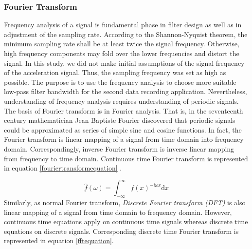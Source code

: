 \documentclass[english,12pt,a4paper,pdftex,elec,utf8]{aaltothesis}
\begin{document}
\subsubsection{Fourier Transform} \label{fouriertransformsection}

Frequency analysis of a signal is fundamental phase in filter design as well as in adjustment of the sampling rate. According to the Shannon-Nyquist theorem, the minimum sampling rate shall be at least twice the signal frequency. Otherwise, high frequency components may fold over the lower frequencies and distort the signal. In this study, we did not make initial assumptions of the signal frequency of the acceleration signal. Thus, the sampling frequency was set as high as possible. The purpose is to use the frequency analysis to choose more suitable low-pass filter bandwidth for the second data recording application. Nevertheless, understanding of frequency analysis requires understanding of periodic signals. The basis of Fourier transform is in Fourier analysis. That is, in the seventeenth century mathematician Jean Baptiste Fourier discovered that periodic signals could be approximated as series of simple sine and cosine functions. In fact, the Fourier transform is linear mapping of a signal from time domain into frequency domain. Correspondingly, inverse Fourier transform is inverse linear mapping from frequency to time domain. Continuous time Fourier transform is represented in equation \ref{fouriertransformequation} \cite{khan2005digital}. 


\begin{equation} \label{fouriertransformequation}
\hat{f}(\omega) =  \int_{- \infty} ^{\infty} f(x) ^{-i\omega x} \mathrm{d}x
\end{equation}  
Similarly, as normal Fourier transform, \textit{Discrete Fourier transform (DFT)} is also linear mapping of a signal from time domain to frequency domain. However, continuous time equations apply on continuous time signals whereas discrete time equations on discrete signals. Corresponding discrete time Fourier transform is represented in equation \ref{fftequation}.
\end{document}
